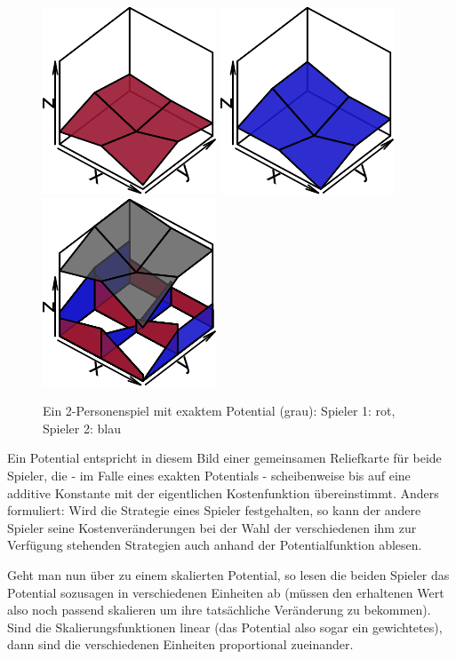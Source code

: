 \begin{figure}[h]\centering
	\includegraphics[width=.3\textwidth]{../Bilder/exaktesPotentialSp1.pdf}
	\includegraphics[width=.3\textwidth]{../Bilder/exaktesPotentialSp2.pdf}
	\includegraphics[width=.3\textwidth]{../Bilder/exaktesPotential.pdf}
	\caption{Ein 2-Personenspiel mit exaktem Potential (grau): Spieler 1: rot, Spieler 2: blau \\}
\end{figure}

Ein Potential entspricht in diesem Bild einer gemeinsamen Reliefkarte für beide Spieler, die - im Falle eines exakten Potentials - \glqq scheibenweise\grqq{} bis auf eine additive Konstante mit der eigentlichen Kostenfunktion übereinstimmt. Anders formuliert: Wird die Strategie eines Spieler festgehalten, so kann der andere Spieler seine Kostenveränderungen bei der Wahl der verschiedenen ihm zur Verfügung stehenden Strategien auch anhand der Potentialfunktion ablesen. 

Geht man nun über zu einem skalierten Potential, so lesen die beiden Spieler das Potential sozusagen in verschiedenen Einheiten ab (müssen den erhaltenen Wert also noch passend skalieren um ihre tatsächliche Veränderung zu bekommen). Sind die Skalierungsfunktionen linear (das Potential also sogar ein gewichtetes), dann sind die verschiedenen Einheiten proportional zueinander.


